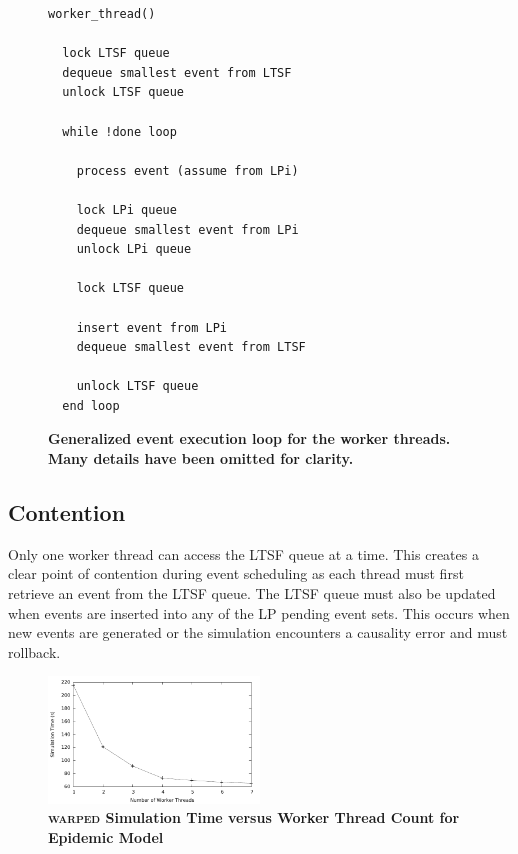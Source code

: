 \documentclass{sig-alternate}
\begin{document}
\begin{figure}
\begin{verbatim}
worker_thread()

  lock LTSF queue
  dequeue smallest event from LTSF
  unlock LTSF queue

  while !done loop

    process event (assume from LPi)

    lock LPi queue 
    dequeue smallest event from LPi
    unlock LPi queue

    lock LTSF queue

    insert event from LPi
    dequeue smallest event from LTSF

    unlock LTSF queue
  end loop
\end{verbatim}
\caption{\textbf{Generalized event execution loop for the worker threads.  Many details
    have been omitted for clarity.}}\label{workerThreadAlgorithm}
\end{figure}

\subsection{Contention}

Only one worker thread can access the LTSF queue at a time.  This creates a clear point of
contention during event scheduling as each thread must first retrieve an event from the
LTSF queue.  The LTSF queue must also be updated when events are inserted into any of the
LP pending event sets.  This occurs when new events are generated or the simulation
encounters a causality error and must rollback.

\begin{figure}
    \centering
    \graphicspath{ {./figures/} }
    \includegraphics[width=0.5\textwidth,keepaspectratio]{notsx_profile}
    \caption{\textbf{\textsc{warped} Simulation Time versus Worker Thread Count for
        Epidemic Model}}\label{fig:notsx_profile}
\end{figure}

\end{document}
